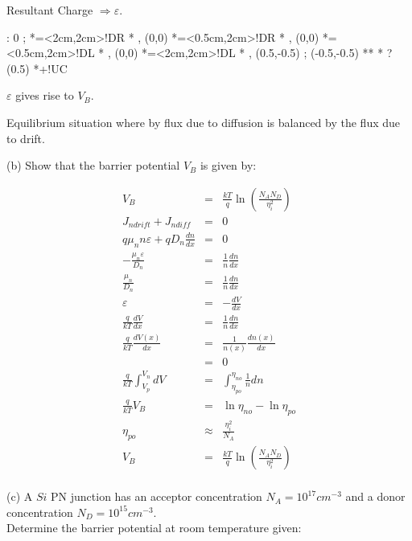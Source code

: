 \documentclass[a4paper,12pt]{article}
\begin{document}
Resultant Charge $\Rightarrow \varepsilon$.

\begin{table}[hbtp]

\xy <1cm,0cm>:
0 ; *=<2cm,2cm>!DR *\frm{-} ,
(0,0) *=<0.5cm,2cm>!DR\txt{-} *\frm{-} ,
(0,0) *=<0.5cm,2cm>!DL\txt{+} *\frm{-} ,
(0,0) *=<2cm,2cm>!DL *\frm{-} ,
(0.5,-0.5) ; (-0.5,-0.5) **\dir{-} *\dir{>} ?(0.5) *+!UC{\varepsilon}
\endxy

\end{table}

$\varepsilon$ gives rise to $V_{B}$.

Equilibrium situation where by flux due to diffusion is balanced by the
flux due to drift.

(b) Show that the barrier potential $V_{B}$ is given by:

\begin{eqnarray*}
V_{B} & = & \frac{kT}{q} \ln{\left(\frac{N_{A}
N_{D}}{\eta_{i}^{2}}\right)} \\
J_{n drift} + J_{n diff} & = & 0 \\
q \mu_{n} n \varepsilon + q D_{n} \frac{dn}{dx} & = & 0 \\
- \frac{\mu_{n} \varepsilon}{D_{n}} & = & \frac{1}{n} \frac{dn}{dx} \\
\frac{\mu_{n}}{D_{n}} & = & \frac{1}{n} \frac{dn}{dx} \\
\varepsilon & = & - \frac{dV}{dx} \\
\frac{q}{kT} \frac{dV}{dx} & = & \frac{1}{n} \frac{dn}{dx} \\
\frac{q}{k T} \frac{dV(x)}{dx} & = &\frac{1}{n(x)} \frac{dn(x)}{dx} \\
 & = & 0 \\
\frac{q}{kT} \int^{V_{n}}_{V_{p}} dV & = & \int^{\eta_{n o}}_{\eta_{p o}}
\frac{1}{n} dn \\
\frac{q}{kT} V_{B} & = & \ln{\eta_{n o}} - \ln{\eta_{p o}} \\
\eta_{p o} & \approx & \frac{\eta_{i}^{2}}{N_{A}} \\
V_{B} & = & \frac{kT}{q} \ln{\left(\frac{N_{A}
N_{D}}{\eta_{i}^{2}}\right)} \\
\end{eqnarray*}

(c) A $Si$ PN junction has an acceptor concentration $N_{A} = 10^{17}
cm^{-3}$ and a donor concentration $N_{D} = 10^{15} cm^{-3}$. \\

Determine the barrier potential at room temperature given:
\end{document}
